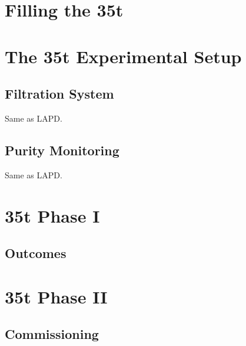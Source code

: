 \section{Filling the 35t}\label{sec:35tFilling}

\section{The 35t Experimental Setup}\label{sec:35tExperiment}

\subsection{Filtration System}\label{sec:35tFiltration}

Same as LAPD.

\subsection{Purity Monitoring}\label{sec:35tPurity}

Same as LAPD.

\section{35t Phase I}\label{sec:35tPhaseI}

\subsection{Outcomes}\label{sec:35tPhaseIOutcomes}

\section{35t Phase II}\label{sec:35tPhaseII}

\subsection{Commissioning}\label{sec:35tCommissioning}

